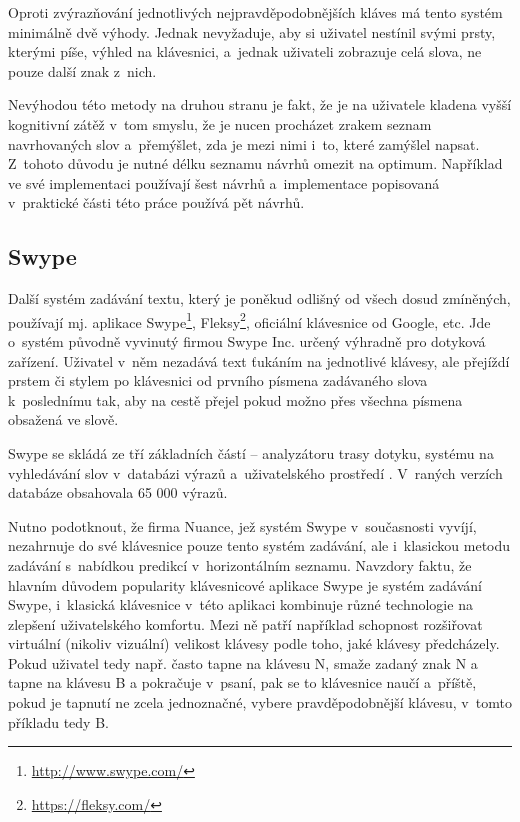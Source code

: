 \documentclass[a4paper,11pt,openany]{book} %
\newcommand\exmp{\textsf}
\begin{document}
Oproti zvýrazňování jednotlivých nejpravděpodobnějších kláves má tento systém minimálně dvě výhody. Jednak nevyžaduje, aby si uživatel nestínil svými prsty, kterými píše, výhled na klávesnici, a~jednak uživateli zobrazuje celá slova, ne pouze další znak z~nich.

Nevýhodou této metody na druhou stranu je fakt, že je na uživatele kladena vyšší kognitivní zátěž v~tom smyslu, že je nucen procházet zrakem seznam navrhovaných slov a~přemýšlet, zda je mezi nimi i~to, které zamýšlel napsat. Z~tohoto důvodu je nutné délku seznamu návrhů omezit na optimum. Například \parencite{neverilovaulipova2014} ve své implementaci používají šest návrhů a~implementace popisovaná v~praktické části této práce používá pět návrhů.

\subsection{Swype}

Další systém zadávání textu, který je poněkud odlišný od všech dosud zmíněných, používají mj. aplikace Swype\footnote{\url{http://www.swype.com/}}, Fleksy\footnote{\url{https://fleksy.com/}}, oficiální klávesnice od Google, etc. Jde o~systém původně vyvinutý firmou Swype Inc. určený výhradně pro dotyková zařízení. Uživatel v~něm nezadává text ťukáním na jednotlivé klávesy, ale přejíždí prstem či stylem po klávesnici od prvního písmena zadávaného slova k~poslednímu tak, aby na cestě přejel pokud možno přes všechna písmena obsažená ve slově. \parencite{swypeabout} %

Swype se skládá ze tří základních částí -- analyzátoru trasy dotyku, systému na vyhledávání slov v~databázi výrazů a~uživatelského prostředí \parencite{kushler2006system}. V~raných verzích databáze obsahovala 65 000 výrazů. \parencite{rafeneedleman2008} %

Nutno podotknout, že firma Nuance, jež systém Swype v~současnosti vyvíjí, nezahrnuje do své klávesnice pouze tento systém zadávání, ale i~klasickou metodu zadávání s~nabídkou predikcí v~horizontálním seznamu. Navzdory faktu, že hlavním důvodem popularity klávesnicové aplikace Swype je systém zadávání Swype, i~klasická klávesnice v~této aplikaci kombinuje různé technologie na zlepšení uživatelského komfortu. Mezi ně patří například schopnost rozšiřovat virtuální (nikoliv vizuální) velikost klávesy podle toho, jaké klávesy předcházely. Pokud uživatel tedy např. často tapne na klávesu \exmp{N}, smaže zadaný znak \exmp{N} a tapne na klávesu \exmp{B} a pokračuje v~psaní, pak se to klávesnice naučí a~příště, pokud je tapnutí ne zcela jednoznačné, vybere pravděpodobnější klávesu, v~tomto příkladu tedy \exmp{B}. \parencite{swypeabout} %
\end{document}
